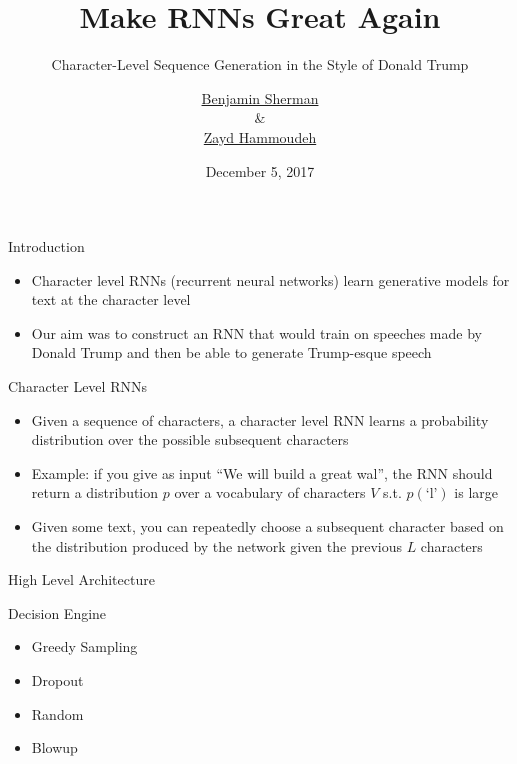 \documentclass[10pt]{beamer}
\title[Trump-ian Speech Generation]%
{\textbf{Make RNNs Great Again}}
\subtitle{Character-Level Sequence Generation in the Style of Donald Trump}  %
\date{December 5, 2017}
\author[Sherman \& Hammoudeh] %
{
  \href{mailto:bcsherma@ucsc.edu}{{Benjamin Sherman}}\\
  \&\\  
  \href{mailto:zayd@ucsc.edu}{{Zayd Hammoudeh}}
}
\institute[
Dept.\ of Computer Science\\
UC, Santa Cruz\\
] %
{%
  Dept.\ of Computer Science\\
  University of California, Santa Cruz\\
  
}
\begin{document}
  {\begin{frame}{}{} %
    \titlepage
  \end{frame}}

	\begin{frame}{Introduction}
		
		\begin{itemize}
			\item Character level RNNs (recurrent neural networks) learn generative models for text at the character level
			
			\item Our aim was to construct an RNN that would train on speeches made by Donald Trump and then be able to generate Trump-esque speech
			
		\end{itemize}
		
	\end{frame}
	
	\begin{frame}{Character Level RNNs}
		
		\begin{itemize}
			\item Given a sequence of characters, a character level RNN learns a probability distribution over the possible subsequent characters
			
			\item Example: if you give as input ``We will build a great wal'', the RNN should return a distribution $p$ over a vocabulary of characters $V$ s.t. $p(\text{`l'})$ is large
			
			\item Given some text, you can repeatedly choose a subsequent character based on the distribution produced by the network given the previous $L$ characters
			
		\end{itemize}
		
	\end{frame}
	
	\begin{frame}{High Level Architecture}
		
		
	\end{frame}
	
	\begin{frame}{Decision Engine}
		
		\begin{itemize}
			\item Greedy Sampling
			\item Dropout
			\item Random
			\item Blowup %
		\end{itemize}
		
	\end{frame}
	
\end{document}
